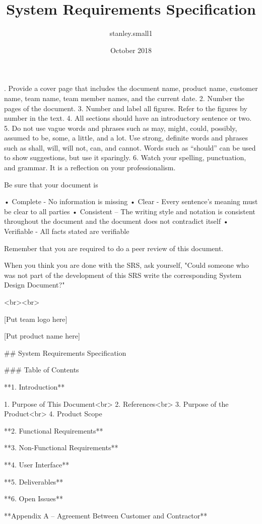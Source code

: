 \documentclass{article}
\title{System Requirements Specification}
\author{stanley.small1 }
\date{October 2018}
\begin{document}
\maketitle

.	Provide a cover page that includes the document name, product name, customer name, team name, team member names, and the current date.
2.	Number the pages of the document.
3.	Number and label all figures.  Refer to the figures by number in the text.
4.	All sections should have an introductory sentence or two.
5.	Do not use vague words and phrases such as may, might, could, possibly, assumed to be, some, a little, and a lot. Use strong, definite words and phrases such as shall, will, will not, can, and cannot.  Words such as “should” can be used to show suggestions, but use it sparingly.
6.	Watch your spelling, punctuation, and grammar.  It is a reflection on your professionalism.

Be sure that your document is

•	Complete - No information is missing 
•	Clear - Every sentence's meaning must be clear to all parties
•	Consistent – The writing style and notation is consistent throughout the document and the document does not contradict itself 
•	Verifiable - All facts stated are verifiable 


Remember that you are required to do a peer review of this document.

When you think you are done with the SRS, ask yourself, "Could someone who was not part of the development of this SRS write the corresponding System Design Document?" 

<br><br>

[Put team logo here]


[Put product name here]


## System Requirements Specification

### Table of Contents

**1.  Introduction**

1. Purpose of This Document<br>
2. References<br>
3. Purpose of the Product<br>
4. Product Scope

**2.  Functional Requirements**

**3.  Non-Functional Requirements**

**4.  User Interface**

**5.  Deliverables**

**6.  Open Issues**

**Appendix A -- Agreement Between Customer and Contractor**
\end{document}
